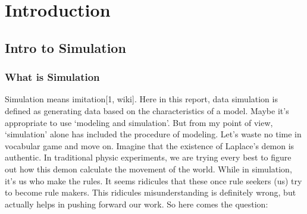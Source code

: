 \documentclass[
12pt, %
a4paper %
]{extreport}
\theoremstyle{plain}
\begin{document}
\listoftables{} %



\chapter{Introduction}
\section{Intro to Simulation}
\subsection{What is Simulation}
Simulation means imitation[1, wiki]. Here in this report, data simulation is defined as generating data based on the characteristics of a model. Maybe it’s appropriate to use ‘modeling and simulation’. But from my point of view, ‘simulation’ alone has included the procedure of modeling. Let’s waste no time in vocabular game and move on. Imagine that the existence of Laplace’s demon is authentic. In traditional physic experiments, we are trying every best to figure out how this demon calculate the movement of the world. While in simulation, it’s us who make the rules. It seems ridicules that these once rule seekers (us) try to become rule makers. This ridicules misunderstanding is definitely wrong, but actually helps in pushing forward our work. So here comes the question:
\end{document}

